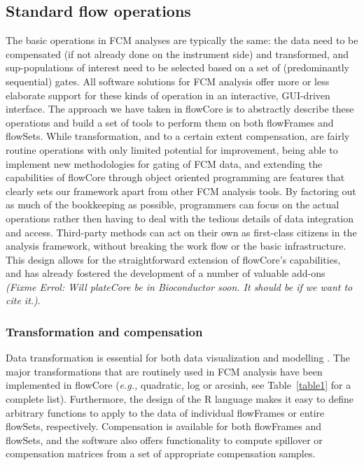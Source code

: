 \documentclass[12pt]{article}
\begin{document}
\subsection*{Standard flow operations}
The basic operations in FCM analyses are typically the same: the data
need to be compensated (if not already done on the instrument side)
and transformed, and sup-populations of interest need to be selected
based on a set of (predominantly sequential) gates. All software
solutions for FCM analysis offer more or less elaborate support for
these kinds of operation in an interactive, GUI-driven interface. The
approach we have taken in flowCore is to abstractly describe these
operations and build a set of tools to perform them on both flowFrames
and flowSets. While transformation, and to a certain extent
compensation, are fairly routine operations with only limited
potential for improvement, being able to implement new methodologies
for gating of FCM data, and extending the capabilities of flowCore
through object oriented programming are features that clearly sets our
framework apart from other FCM analysis tools. By factoring out as
much of the bookkeeping as possible, programmers can focus on the
actual operations rather then having to deal with the tedious details
of data integration and access. Third-party methods can act on their
own as first-class citizens in the analysis framework, without
breaking the work flow or the basic infrastructure. This design allows
for the straightforward extension of flowCore's capabilities, and has
already fostered the development of a number of valuable add-ons
\citep{lo2008agf,sarkar2008ufv} \textit{(Fixme Errol: Will plateCore
  be in Bioconductor soon. It should be if we want to cite it.)}.




\subsubsection*{Transformation and compensation}
Data transformation is essential for both data visualization and
modelling \citep{lo2008agf}. The major transformations that are
routinely used in FCM analysis have been implemented in flowCore
(\textit{e.g.,} quadratic, log or arcsinh, see Table~\ref{table1} for a
complete list). Furthermore, the design of the R language makes it
easy to define arbitrary functions to apply to the data of individual
flowFrames or entire flowSets, respectively. Compensation is
available for both flowFrames and flowSets, and the software also
offers functionality to compute spillover or compensation matrices
from a set of appropriate compensation samples.
\end{document}
